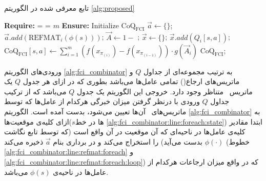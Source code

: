 \begin{algorithm}[t]
\caption{تابع  معرفی شده در الگوریتم \ref{alg:proposed}}\label{alg:fci_combinator}
\begin{latin}
\begin{algorithmic}[1]
\State \textbf{Require:}  =  = $m$
\State \textbf{Ensure:} {Initialize $\text{CoQ}_{\text{FCI}}$} 
	 \label{alg:fci_combinator:line:foreach:state}
		\State $\vec{a} \gets \{\}$; 
		\label{alg:fci_combinator:line:refmat:foreach}
			\State $\vec{a}.add(\text{REFMAT}_i(\phi(s)))$;\label{alg:fci_combinator:line:refmat:foreach:loop}
		\EndFor
		\State $\vec{A} \gets 1 - $ ; \label{alg:fci_combinator:line:normalize}
		 \label{alg:fci_combinator:line:fci:foreach:state_action}
			\State $\vec{x} \gets \{\}$; 
			 \label{alg:fci_combinator:line:fci:foreach:state_action:x}
				\State $\vec{x}.add(Q_i[s, a])$;\label{alg:fci_combinator:line:fci:foreach:state_action:x:loop}
			\EndFor
			\State $\text{CoQ}_{\text{FCI}}[s, a] \gets \sum_{i = 1}^{m} \left( f(x_{\pi_{(i)}}) - f(x_{\pi_{(i-1)}}) \right) \cdot g(\vec{A}_i)$  \label{alg:fci_combinator:line:fci}
		\EndFor
	\EndFor
\State \Return $\text{CoQ}_{\text{FCI}}$;
\EndFunction
\end{algorithmic}
\end{latin}
\end{algorithm}

ورودی‌های الگوریتم
\ref{alg:fci_combinator}
به ترتیب مجموعه‌ای از جداول $Q$ و ماتریس‌های ارجاع() تمامی عامل‌ها می‌باشد بطوری که در ازای هر جدول $Q$ یک ماتریس \ متناظر وجود دارد. خروجی این الگوریتم یک جدول $Q$ می‌باشد که از ترکیب جداول $Q$ ورودی با درنظر گرفتن میزان خبرگی هرکدام از عامل‌ها که توسط ماتریس‌های \ آن‌ها تعیین می‌شود، بدست آمده است. الگوریتم
\ref{alg:fci_combinator}
به ازای کلیه‌ی موقعیت‌ها($s$ها در خط \ref{alg:fci_combinator:line:foreach:state}) ابتدا مقادیر \ کلیه‌ی عامل‌ها در ناحیه‌ای که آن موقعیت در آن واقع است (که توسط تابع نگاشت $\phi(\cdot)$ بدست می‌آید) را استخراج می‌کند و در برداری بنام $\vec{a}$ ذخیره می‌کند (خطوط \ref{alg:fci_combinator:line:refmat:foreach} و \ref{alg:fci_combinator:line:refmat:foreach:loop}) که در واقع میزان ارجاعات هرکدام از عامل‌ها در ناحیه‌ی $\phi(s)$ می‌باشد.

